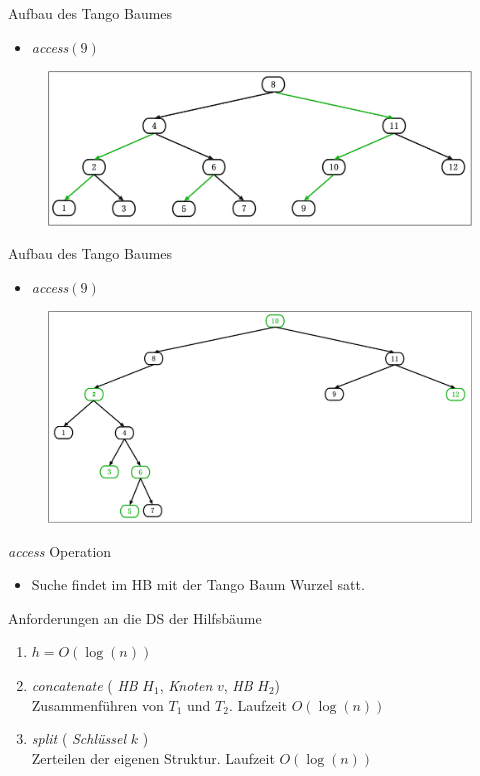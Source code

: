 \documentclass[11pt]{beamer}
\begin{document}
\begin{frame} {Aufbau des Tango Baumes}
	\begin{itemize}
		\item \textit{access}$\left(9\right)$
	\end{itemize}
	\begin{figure}[H]
		\centering
		\includegraphics[width=1\textwidth]{"Medien/pres/prefChilds2"}
	\end{figure}	
\end{frame}

\begin{frame} {Aufbau des Tango Baumes}
		\begin{itemize}
		\item \textit{access}$\left(9\right)$
	\end{itemize}
	\begin{figure}[H]
		\centering
		\includegraphics[width=1\textwidth]{"Medien/pres/tangoBaum2"}
	\end{figure}
\end{frame}


\begin{frame} {\textit{access }Operation}
		\begin{itemize}
		\item Suche findet im HB mit der Tango Baum Wurzel satt.
	\end{itemize}
	
	Anforderungen an die DS der Hilfsbäume
	\begin{enumerate}
		\item $h = O\left(\log\left(n\right)\right)$
		\item \textit{concatenate} ( \textit{HB} $H_1$, \textit{Knoten } $v$, \textit{HB} $H_2$)\\
		Zusammenführen von $T_1$ und $T_2$. Laufzeit $O\left(\log\left(n\right)\right)$
		\item \textit{split} ( \textit{Schlüssel} $k$ )\\
		Zerteilen der eigenen Struktur. Laufzeit $O\left(\log\left(n\right)\right)$
	\end{enumerate}
 \end{frame}
\end{document}

